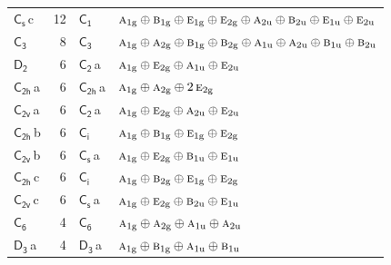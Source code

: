 \documentclass[10pt,a4paper]{article}
\numberwithin{equation}{section}
\newcommand{\grp}[1]{\mathsf{#1}}
\newcommand{\irr}[1]{\text{\normalfont\scshape #1}}
\newcommand{\ptag}[1]{\mathrm{#1}}
\newcommand{\clsletter}[1]{\,{\scriptsize\color{black!55}#1}}
\newlength{\fillwidth}\newlength{\cellwidth}\newlength{\colwidth}
\begin{document}
{\begin{longtable}{@{}lrl>{\RaggedRight\arraybackslash}p{\fillwidth}@{}}
\href{C1v.pdf}{$\grp{C_{s}}$}\clsletter{c} & 12 & \href{C1.pdf}{$\grp{C_{1}}$} & $\irr{a}_{1\ptag{g}}\oplus \irr{b}_{1\ptag{g}}\oplus \irr{e}_{1\ptag{g}}\oplus \irr{e}_{2\ptag{g}}\oplus \irr{a}_{2\ptag{u}}\oplus \irr{b}_{2\ptag{u}}\oplus \irr{e}_{1\ptag{u}}\oplus \irr{e}_{2\ptag{u}}$\\
\href{C3.pdf}{$\grp{C_{3}}$} & 8 & \href{C3.pdf}{$\grp{C_{3}}$} & $\irr{a}_{1\ptag{g}}\oplus \irr{a}_{2\ptag{g}}\oplus \irr{b}_{1\ptag{g}}\oplus \irr{b}_{2\ptag{g}}\oplus \irr{a}_{1\ptag{u}}\oplus \irr{a}_{2\ptag{u}}\oplus \irr{b}_{1\ptag{u}}\oplus \irr{b}_{2\ptag{u}}$\\
\href{D2.pdf}{$\grp{D_{2}}$} & 6 & \href{C2.pdf}{$\grp{C_{2}}$}\clsletter{a} & $\irr{a}_{1\ptag{g}}\oplus \irr{e}_{2\ptag{g}}\oplus \irr{a}_{1\ptag{u}}\oplus \irr{e}_{2\ptag{u}}$\\
\href{C2h.pdf}{$\grp{C_{2h}}$}\clsletter{a} & 6 & \href{C2h.pdf}{$\grp{C_{2h}}$}\clsletter{a} & $\irr{a}_{1\ptag{g}}\oplus \irr{a}_{2\ptag{g}}\oplus 2\,\irr{e}_{2\ptag{g}}$\\
\href{C2v.pdf}{$\grp{C_{2v}}$}\clsletter{a} & 6 & \href{C2.pdf}{$\grp{C_{2}}$}\clsletter{a} & $\irr{a}_{1\ptag{g}}\oplus \irr{e}_{2\ptag{g}}\oplus \irr{a}_{2\ptag{u}}\oplus \irr{e}_{2\ptag{u}}$\\
\href{C2h.pdf}{$\grp{C_{2h}}$}\clsletter{b} & 6 & \href{S2.pdf}{$\grp{C_{i}}$} & $\irr{a}_{1\ptag{g}}\oplus \irr{b}_{1\ptag{g}}\oplus \irr{e}_{1\ptag{g}}\oplus \irr{e}_{2\ptag{g}}$\\
\href{C2v.pdf}{$\grp{C_{2v}}$}\clsletter{b} & 6 & \href{C1v.pdf}{$\grp{C_{s}}$}\clsletter{a} & $\irr{a}_{1\ptag{g}}\oplus \irr{e}_{2\ptag{g}}\oplus \irr{b}_{1\ptag{u}}\oplus \irr{e}_{1\ptag{u}}$\\
\href{C2h.pdf}{$\grp{C_{2h}}$}\clsletter{c} & 6 & \href{S2.pdf}{$\grp{C_{i}}$} & $\irr{a}_{1\ptag{g}}\oplus \irr{b}_{2\ptag{g}}\oplus \irr{e}_{1\ptag{g}}\oplus \irr{e}_{2\ptag{g}}$\\
\href{C2v.pdf}{$\grp{C_{2v}}$}\clsletter{c} & 6 & \href{C1v.pdf}{$\grp{C_{s}}$}\clsletter{a} & $\irr{a}_{1\ptag{g}}\oplus \irr{e}_{2\ptag{g}}\oplus \irr{b}_{2\ptag{u}}\oplus \irr{e}_{1\ptag{u}}$\\
\href{C6.pdf}{$\grp{C_{6}}$} & 4 & \href{C6.pdf}{$\grp{C_{6}}$} & $\irr{a}_{1\ptag{g}}\oplus \irr{a}_{2\ptag{g}}\oplus \irr{a}_{1\ptag{u}}\oplus \irr{a}_{2\ptag{u}}$\\
\href{D3.pdf}{$\grp{D_{3}}$}\clsletter{a} & 4 & \href{D3.pdf}{$\grp{D_{3}}$}\clsletter{a} & $\irr{a}_{1\ptag{g}}\oplus \irr{b}_{1\ptag{g}}\oplus \irr{a}_{1\ptag{u}}\oplus \irr{b}_{1\ptag{u}}$\\

\end{longtable}}
\end{document}
